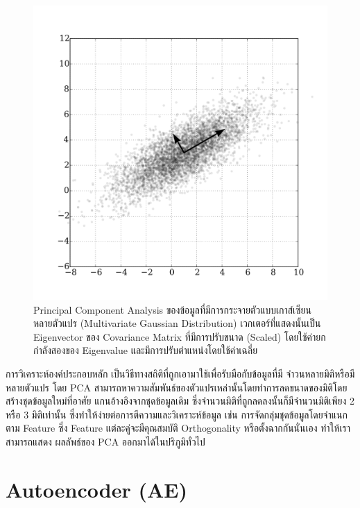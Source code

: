 \begin{figure}[H]
    \centering
    \includegraphics[width=0.8\linewidth]{fig/pca.png}
    \caption{Principal Component Analysis ของข้อมูลที่มีการกระจายตัวแบบเกาส์เซียนหลายตัวแปร (Multivariate Gaussian
    Distribution) เวกเตอร์ที่แสดงนั้นเป็น Eigenvector ของ Covariance Matrix ที่มีการปรับขนาด (Scaled) โดยใช้ค่ายกกำลังสองของ 
    Eigenvalue และมีการปรับตำแหน่งโดยใช้ค่าเฉลี่ย}
    \label{fig:pca}
\end{figure}

การวิเคราะห์องค์ประกอบหลัก เป็นวิธีทางสถิติที่ถูกเอามาใช้เพื่อรับมือกับข้อมูลที่มี
จำวนหลายมิติหรือมีหลายตัวแปร โดย PCA สามารถหาความสัมพันธ์ของตัวแปรเหล่านั้นโดยทำการลดขนาดของมิติโดยสร้างชุดข้อมูลใหม่ที่อาศัย
แกนอ้างอิงจากชุดข้อมูลเดิม ซึ่งจำนวนมิติที่ถูกลดลงนั้นก็มีจำนวนมิติเพียง 2 หรือ 3 มิติเท่านั้น ซึ่งทำให้ง่ายต่อการตีความและวิเคราะห์ข้อมูล เช่น
การจัดกลุ่มชุดข้อมูลโดยจำแนกตาม Feature ซึ่ง Feature แต่ละคู่จะมีคุณสมบัติ Orthogonality หรือตั้งฉากกันนั่นเอง ทำให้เราสามารถแสดง
ผลลัพธ์ของ PCA ออกมาได้ในปริภูมิทั่วไป

\section{Autoencoder (AE)}


